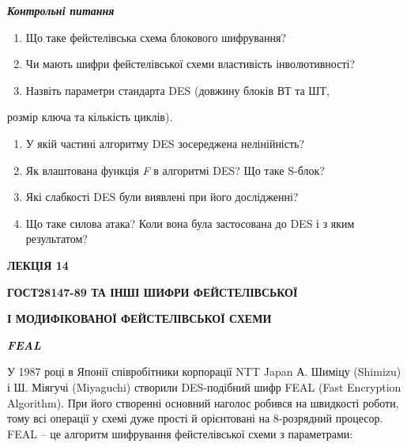 \documentclass[a4paper]{article}
\newcounter{saveenum}
\newcommand\liststyleWWviiiNumxviii{%
\renewcommand\theenumi{\arabic{enumi}}
\renewcommand\theenumii{\alph{enumii}}
\renewcommand\theenumiii{\roman{enumiii}}
\renewcommand\theenumiv{\arabic{enumiv}}
\renewcommand\labelenumi{\theenumi.}
\renewcommand\labelenumii{\theenumii.}
\renewcommand\labelenumiii{\theenumiii.}
\renewcommand\labelenumiv{\theenumiv.}
}
\newcounter{}
\begin{document}
\bigskip

{\centering\bfseries\itshape
Контрольні питання
\par}


\bigskip


\bigskip

\liststyleWWviiiNumxviii
\begin{enumerate}
\item Що таке фейстелівська схема блокового шифрування? 
\item Чи мають шифри фейстелівської схеми властивість інволютивності?
\item Назвіть параметри стандарта DES (довжину блоків ВТ та ШТ, 
\end{enumerate}
розмір ключа та кількість циклів).

\liststyleWWviiiNumxviii
\setcounter{saveenum}{\value{enumi}}
\begin{enumerate}
\setcounter{enumi}{\value{saveenum}}
\item У якій частині алгоритму DES зосереджена нелінійність?
\item Як влаштована функція \textit{F}\textit{ }в алгоритмі DES? Що таке
S{}-блок?
\item Які слабкості DES були виявлені при його дослідженні?
\item Що таке силова атака? Коли вона була застосована до DES і з яким
результатом?
\end{enumerate}

\bigskip


\bigskip

{\bfseries
ЛЕКЦІЯ  14}


\bigskip

{\centering\bfseries
ГОСТ28147-89  ТА ІНШІ ШИФРИ  ФЕЙСТЕЛІВСЬКОЇ 
\par}

{\centering\bfseries
І  МОДИФІКОВАНОЇ  ФЕЙСТЕЛІВСЬКОЇ  СХЕМИ
\par}


\bigskip


\bigskip

{\centering\bfseries\itshape
FEAL
\par}


\bigskip

У 1987 році в Японії співробітники корпорації NTT Japan А. Шиміцу (Shimizu) і Ш.
Міягучі (Miyaguchi) створили DES-подібний шифр FEAL (Fast Encryption
Algorithm). При його створенні основний наголос робився на швидкості роботи,
тому всі операції у схемі дуже прості й орієнтовані на 8-розрядний процесор.
FEAL  – це алгоритм шифрування фейстелівської схеми з параметрами:
\end{document}
